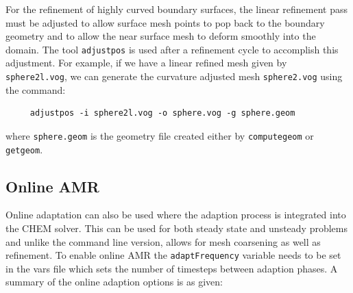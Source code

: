 For the refinement of highly curved boundary surfaces, the linear
refinement pass must be adjusted to allow surface mesh points to pop
back to the boundary geometry and to allow the near surface mesh to
deform smoothly into the domain.  The tool \verb!adjustpos! is used
after a refinement cycle to accomplish this adjustment.  For example,
if we have a linear refined mesh given by \verb!sphere2l.vog!, we can
generate the curvature adjusted mesh \verb!sphere2.vog! using the
command:
\begin{verbatim}
     adjustpos -i sphere2l.vog -o sphere.vog -g sphere.geom
\end{verbatim}
where \verb!sphere.geom! is the geometry file created either by \verb!computegeom! or \verb!getgeom!.

\subsection{Online AMR}

Online adaptation can also be used where the adaption process is
integrated into the CHEM solver.  This can be used for both steady
state and unsteady problems and unlike the command line version,
allows for mesh coarsening as well as refinement.  To enable online
AMR the {\tt adaptFrequency} variable needs to be set in the vars file
which sets the number of timesteps between adaption phases.  A summary
of the online adaption options is as given:

